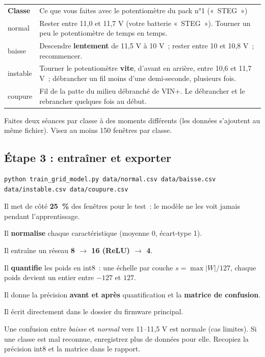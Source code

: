 \begin{tabularx}{\linewidth}{P{1.8cm}L}
 \textbf{Classe} & Ce que vous faites avec le potentiomètre du pack n°1 («~STEG~») \\
normal & Rester entre 11,0 et 11,7 V (votre batterie «~STEG~»). Tourner un peu le potentiomètre de temps en temps. \\
baisse & Descendre \textbf{lentement} de 11,5 V à 10 V~; rester entre 10 et 10,8 V~; recommencer. \\
instable & Tourner le potentiomètre \textbf{vite}, d'avant en arrière, entre 10,6 et 11,7 V~; débrancher un fil moins d'une demi-seconde, plusieurs fois. \\
coupure & Fil de la patte du milieu débranché de VIN+. Le débrancher et le rebrancher quelques fois au début. \\
\end{tabularx}

Faites deux séances par classe à des moments différents (les données s'ajoutent au même fichier). Visez au moins 150 fenêtres par classe.

\subsection{Étape 3 : entraîner et exporter}
\begin{lstlisting}[style=cmd]
python train_grid_model.py data/normal.csv data/baisse.csv data/instable.csv data/coupure.csv
\end{lstlisting}
\begin{steps}
  \item Il met de côté \textbf{25~\%} des fenêtres pour le test~: le modèle ne les voit jamais pendant l'apprentissage.
  \item Il \textbf{normalise} chaque caractéristique (moyenne 0, écart-type 1).
  \item Il entraîne un réseau \textbf{8 $\rightarrow$ 16 (ReLU) $\rightarrow$ 4}.
  \item Il \textbf{quantifie} les poids en int8~: une échelle par couche $s = \max|W| / 127$, chaque poids devient un entier entre $-127$ et $127$.
  \item Il donne la précision \textbf{avant et après} quantification et la \textbf{matrice de confusion}.
  \item Il écrit  directement dans le dossier du firmware principal.
\end{steps}
Une confusion entre \emph{baisse} et \emph{normal} vers 11--11,5 V est normale (cas limites). Si une classe est mal reconnue, enregistrez plus de données pour elle. Recopiez la précision int8 et la matrice dans le rapport.


